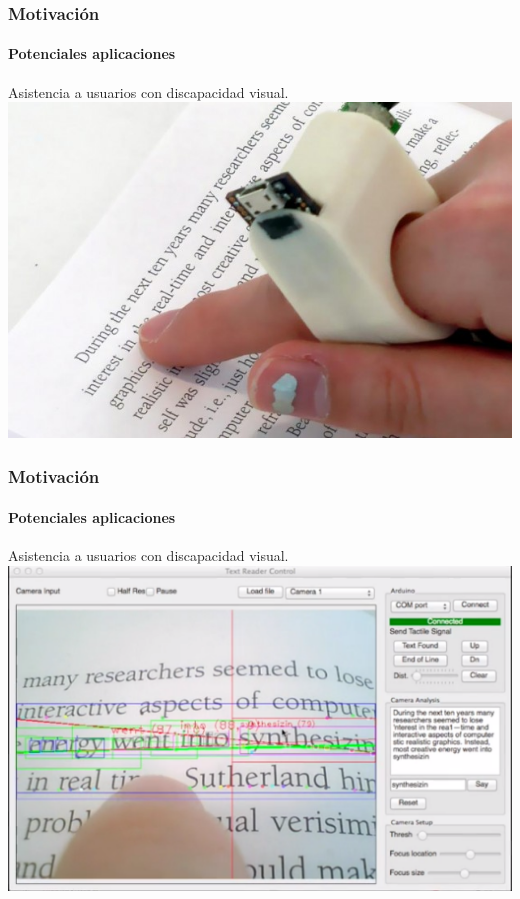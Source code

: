 	\begin{frame}
		\frametitle{Motivación}
		\framesubtitle{Potenciales aplicaciones}
		\begin{center}
			Asistencia a usuarios con discapacidad visual.
			\includegraphics[height=0.65\paperheight]{imgs/finger_reader.jpg}	
		\end{center}
	\end{frame}
	\begin{frame}
		\frametitle{Motivación}
		\framesubtitle{Potenciales aplicaciones}
		\begin{center}
			Asistencia a usuarios con discapacidad visual.
			\includegraphics[height=0.65\paperheight]{imgs/finger_reader_use.png}		
		\end{center}
	\end{frame}
